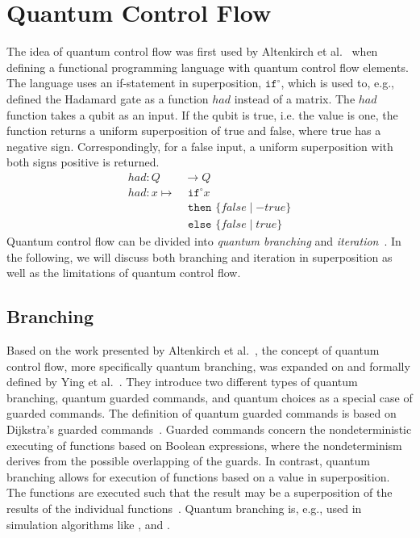 \section{Quantum Control Flow}
\label{sec:background_quantumControlFlow}
The idea of quantum control flow was first used by Altenkirch et al.~\cite{AlGr05} when defining a functional programming language with quantum control flow elements. The language uses an if-statement in superposition, $\texttt{if}^\circ$, which is used to, e.g., defined the Hadamard gate as a function $had$ instead of a matrix. The $had$ function takes a qubit as an input. If the qubit is true, i.e. the value is one, the function returns a uniform superposition of true and false, where true has a negative sign. Correspondingly, for a false input, a uniform superposition with both signs positive is returned.
\begin{align*}
    had : Q& \to Q\\
    had : x \mapsto& \texttt{ if}^\circ x\\
                   & \texttt{ then } \{false \mid -true\}\\
                   & \texttt{ else } \{false \mid true\}
\end{align*}
Quantum control flow can be divided into \emph{quantum branching} and \emph{iteration}~\cite{YVC24}. In the following, we will discuss both branching and iteration in superposition as well as the limitations of quantum control flow. 

\subsection{Branching}
\label{sec:background_branching}
Based on the work presented by Altenkirch et al.~\cite{AlGr05}, the concept of quantum control flow, more specifically quantum branching, was expanded on and formally defined by Ying et al.~\cite{YYF12}. They introduce two different types of quantum branching, quantum guarded commands, and quantum choices as a special case of guarded commands. The definition of quantum guarded commands is based on Dijkstra's guarded commands~\cite{Dijk75}. Guarded commands concern the nondeterministic executing of functions based on Boolean expressions, where the nondeterminism derives from the possible overlapping of the guards. In contrast, quantum branching allows for execution of functions based on a value in superposition. The functions are executed such that the result may be a superposition of the results of the individual functions~\cite{YVC24}.
Quantum branching is, e.g., used in simulation algorithms like \cite{BGB*18}, and \cite{LoCh19}.

